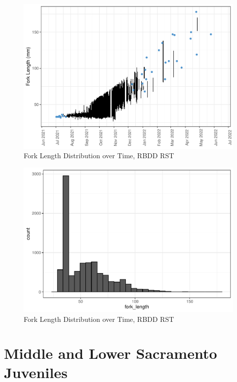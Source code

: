 \documentclass[
]{book}
\theoremstyle{definition}
\theoremstyle{definition}
\theoremstyle{definition}
\theoremstyle{definition}
\theoremstyle{remark}
\begin{document}
\begin{figure}
\centering
\includegraphics{_main_files/figure-latex/rbdd-fl-fig-1.pdf}
\caption{\label{fig:rbdd-fl-fig}Fork Length Distribution over Time, RBDD RST}
\end{figure}

\begin{figure}
\centering
\includegraphics{_main_files/figure-latex/rbdd-flhist-fig-1.pdf}
\caption{\label{fig:rbdd-flhist-fig}Fork Length Distribution over Time, RBDD RST}
\end{figure}

\hypertarget{middle-and-lower-sacramento-juveniles}{%
\chapter{Middle and Lower Sacramento Juveniles}\label{middle-and-lower-sacramento-juveniles}}
\end{document}
